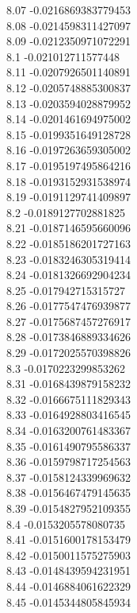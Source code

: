 {8.07	-0.0216869383779453\\
8.08	-0.0214598311427097\\
8.09	-0.0212350971072291\\
8.1	-0.021012711577448\\
8.11	-0.0207926501140891\\
8.12	-0.0205748885300837\\
8.13	-0.0203594028879952\\
8.14	-0.0201461694975002\\
8.15	-0.0199351649128728\\
8.16	-0.0197263659305002\\
8.17	-0.0195197495864216\\
8.18	-0.0193152931538974\\
8.19	-0.0191129741409897\\
8.2	-0.0189127702881825\\
8.21	-0.0187146595660096\\
8.22	-0.0185186201727163\\
8.23	-0.0183246305319414\\
8.24	-0.0181326692904234\\
8.25	-0.017942715315727\\
8.26	-0.0177547476939877\\
8.27	-0.0175687457276917\\
8.28	-0.0173846889334626\\
8.29	-0.0172025570398826\\
8.3	-0.0170223299853262\\
8.31	-0.0168439879158232\\
8.32	-0.0166675111829343\\
8.33	-0.0164928803416545\\
8.34	-0.0163200761483367\\
8.35	-0.0161490795586337\\
8.36	-0.0159798717254563\\
8.37	-0.0158124339969632\\
8.38	-0.0156467479145635\\
8.39	-0.0154827952109355\\
8.4	-0.0153205578080735\\
8.41	-0.0151600178153479\\
8.42	-0.0150011575275903\\
8.43	-0.0148439594231951\\
8.44	-0.0146884061622329\\
8.45	-0.0145344805845934\\
}
